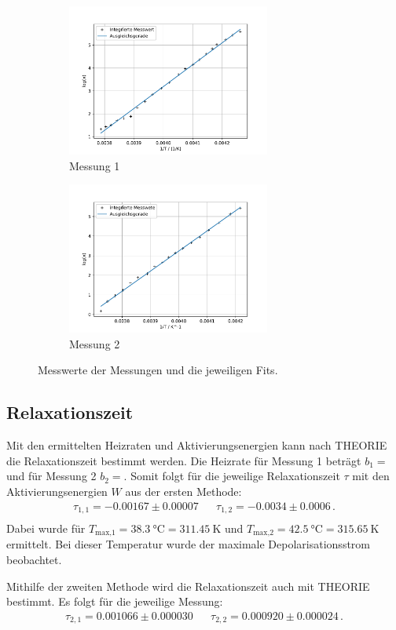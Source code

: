   \begin{figure}
    \begin{subfigure}[b]{.5\linewidth}
      \centering
      \includegraphics[height=5cm, keepaspectratio]{build/log(int)_2durchT_1.pdf}
      \caption{Messung 1}
    \end{subfigure}
    \begin{subfigure}[b]{.5\linewidth}
      \centering
      \includegraphics[height=5cm, keepaspectratio]{build/log(int)_2durchT_2.pdf}
      \caption{Messung 2}
    \end{subfigure}
    \caption{Messwerte der Messungen und die jeweiligen Fits.}
    \label{fig:Trapez}
  \end{figure} %

\subsection{Relaxationszeit}
  Mit den ermittelten Heizraten und Aktivierungsenergien kann nach THEORIE die Relaxationszeit bestimmt werden.
  Die Heizrate für Messung 1 beträgt $b_1 = $ und für Messung 2 $b_2 = $.
  Somit folgt für die jeweilige Relaxationszeit $\tau$ mit den Aktivierungsenergien $W$ aus der ersten Methode:
  \begin{align*}
    \tau_{1,1} = -0.00167 \pm 0.00007 &&  \tau_{1,2} = -0.0034 \pm 0.0006 \, . \\
  \end{align*}
  Dabei wurde für $T_\text{max,1} = \SI{38.3}{\celsius} = \SI{311.45}{\kelvin} $ und $T_\text{max,2} = \SI{42.5}{\celsius} = \SI{315.65}{\kelvin}$ ermittelt.
  Bei dieser Temperatur wurde der maximale Depolarisationsstrom beobachtet.

  \noindent
  Mithilfe der zweiten Methode wird die Relaxationszeit auch mit THEORIE bestimmt.
  Es folgt für die jeweilige Messung:
  \begin{align*}
    \tau_{2,1} =  0.001066 \pm 0.000030 &&  \tau_{2,2} = 0.000920 \pm 0.000024\, . \\
  \end{align*}
